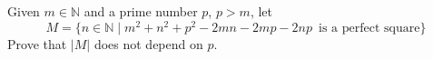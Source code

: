 Given $m\in\mathbb{N}$ and a prime number $p$, $p>m$, let
\[M=\{n\in\mathbb{N}\mid m^2+n^2+p^2-2mn-2mp-2np \,\,\, \text{is a perfect square}  \} \]
Prove that $|M|$ does not depend on $p$.


